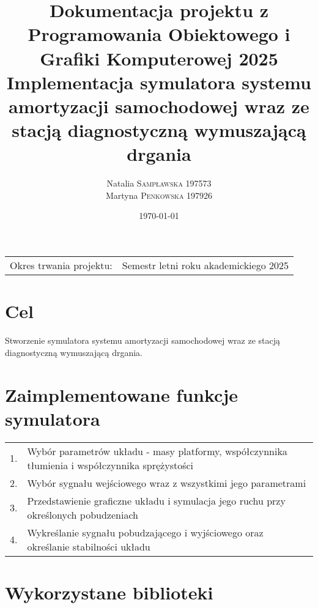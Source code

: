 \documentclass[10pt, a4paper]{article}
\title{
  \textbf{Dokumentacja projektu z Programowania Obiektowego i Grafiki Komputerowej 2025} \\
  \large Implementacja symulatora systemu amortyzacji samochodowej wraz ze stacją diagnostyczną wymuszającą drgania
}
\author{
  Natalia \textsc{Sampławska 197573} \\
  Martyna \textsc{Penkowska 197926}
}
\date{\today}
\begin{document}
\maketitle

\begin{center}
  \begin{tabular}{l r}
    Okres trwania projektu: & Semestr letni roku akademickiego 2025 \\
  \end{tabular}
\end{center}

\vspace{0.1cm}


\section{Cel}

Stworzenie symulatora systemu amortyzacji samochodowej wraz ze stacją diagnostyczną wymuszającą drgania. 


\section{Zaimplementowane funkcje symulatora}

\begin{tabular}{l l}
	1. & Wybór parametrów układu - masy platformy, współczynnika tłumienia i współczynnika sprężystości\\ 
	2. & Wybór sygnału wejściowego wraz z wszystkimi jego parametrami\\
	3. & Przedstawienie graficzne układu i symulacja jego ruchu przy określonych pobudzeniach\\
	4. & Wykreślanie sygnału pobudzającego i wyjściowego oraz określanie stabilności układu\\
\end{tabular}


\section{Wykorzystane biblioteki}
\end{document}
